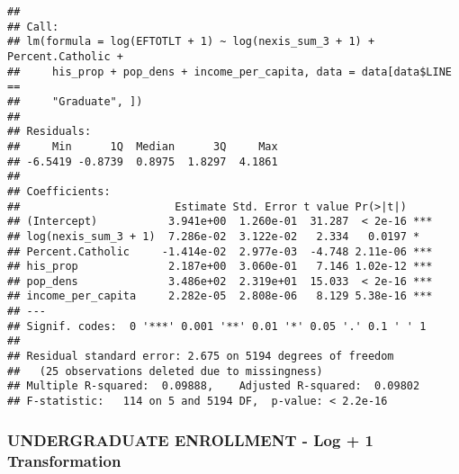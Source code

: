 \documentclass[]{article}
\newenvironment{Shaded}{\begin{snugshade}}{\end{snugshade}}
\newcommand{\KeywordTok}[1]{\textcolor[rgb]{0.13,0.29,0.53}{\textbf{#1}}}
\newcommand{\DataTypeTok}[1]{\textcolor[rgb]{0.13,0.29,0.53}{#1}}
\newcommand{\DecValTok}[1]{\textcolor[rgb]{0.00,0.00,0.81}{#1}}
\newcommand{\StringTok}[1]{\textcolor[rgb]{0.31,0.60,0.02}{#1}}
\newcommand{\OperatorTok}[1]{\textcolor[rgb]{0.81,0.36,0.00}{\textbf{#1}}}
\newcommand{\NormalTok}[1]{#1}
\begin{document}
\begin{verbatim}
## 
## Call:
## lm(formula = log(EFTOTLT + 1) ~ log(nexis_sum_3 + 1) + Percent.Catholic + 
##     his_prop + pop_dens + income_per_capita, data = data[data$LINE == 
##     "Graduate", ])
## 
## Residuals:
##     Min      1Q  Median      3Q     Max 
## -6.5419 -0.8739  0.8975  1.8297  4.1861 
## 
## Coefficients:
##                        Estimate Std. Error t value Pr(>|t|)    
## (Intercept)           3.941e+00  1.260e-01  31.287  < 2e-16 ***
## log(nexis_sum_3 + 1)  7.286e-02  3.122e-02   2.334   0.0197 *  
## Percent.Catholic     -1.414e-02  2.977e-03  -4.748 2.11e-06 ***
## his_prop              2.187e+00  3.060e-01   7.146 1.02e-12 ***
## pop_dens              3.486e+02  2.319e+01  15.033  < 2e-16 ***
## income_per_capita     2.282e-05  2.808e-06   8.129 5.38e-16 ***
## ---
## Signif. codes:  0 '***' 0.001 '**' 0.01 '*' 0.05 '.' 0.1 ' ' 1
## 
## Residual standard error: 2.675 on 5194 degrees of freedom
##   (25 observations deleted due to missingness)
## Multiple R-squared:  0.09888,    Adjusted R-squared:  0.09802 
## F-statistic:   114 on 5 and 5194 DF,  p-value: < 2.2e-16
\end{verbatim}

\subsubsection{UNDERGRADUATE ENROLLMENT - Log + 1
Transformation}\label{undergraduate-enrollment---log-1-transformation}

\begin{Shaded}
\end{Shaded}
\end{document}
